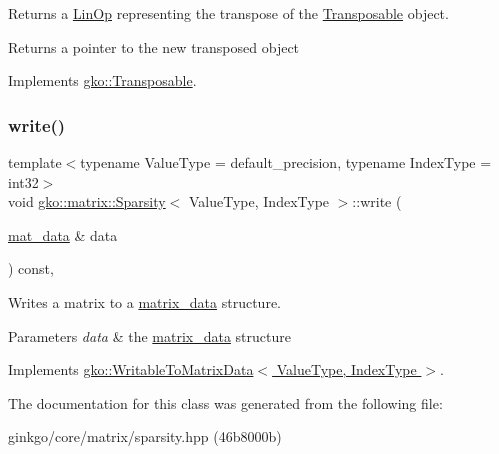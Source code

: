 Returns a \hyperlink{classgko_1_1LinOp}{Lin\+Op} representing the transpose of the \hyperlink{classgko_1_1Transposable}{Transposable} object. 

\begin{DoxyReturn}{Returns}
a pointer to the new transposed object 
\end{DoxyReturn}


Implements \hyperlink{classgko_1_1Transposable_a5c6b778b71b47d53e0bda6ccf894d318}{gko\+::\+Transposable}.

\mbox{\label{classgko_1_1matrix_1_1Sparsity_a19da921c91836bc5a6fc20e3abc5c812}} 
\subsubsection{\texorpdfstring{write()}{write()}}
{\footnotesize\ttfamily template$<$typename Value\+Type  = default\+\_\+precision, typename Index\+Type  = int32$>$ \\
void \hyperlink{classgko_1_1matrix_1_1Sparsity}{gko\+::matrix\+::\+Sparsity}$<$ Value\+Type, Index\+Type $>$\+::write (\begin{DoxyParamCaption}\item[{\hyperlink{structgko_1_1matrix__data}{mat\+\_\+data} \&}]{data }\end{DoxyParamCaption}) const\hspace{0.3cm}{\ttfamily [override]}, {\ttfamily [virtual]}}



Writes a matrix to a \hyperlink{structgko_1_1matrix__data}{matrix\+\_\+data} structure. 


\begin{DoxyParams}{Parameters}
{\em data} & the \hyperlink{structgko_1_1matrix__data}{matrix\+\_\+data} structure \\
\hline
\end{DoxyParams}


Implements \hyperlink{classgko_1_1WritableToMatrixData_a96036c3a4bf4c67fa93002808b8b14e2}{gko\+::\+Writable\+To\+Matrix\+Data$<$ Value\+Type, Index\+Type $>$}.



The documentation for this class was generated from the following file\+:\begin{DoxyCompactItemize}
\item 
ginkgo/core/matrix/sparsity.\+hpp (46b8000b)\end{DoxyCompactItemize}
